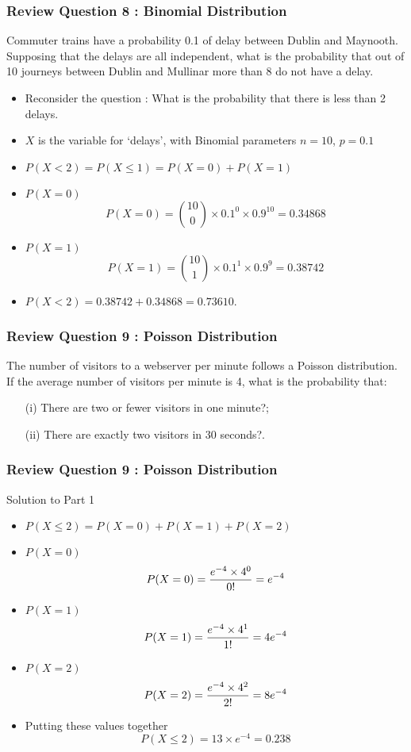 \documentclass[a4]{beamer}
\begin{document}
\begin{frame}
\frametitle{Review Question 8 :  Binomial Distribution}
Commuter trains have a probability 0.1 of delay
between Dublin and Maynooth. Supposing that the delays are all independent,
what is the probability that out of 10 journeys between Dublin and
Mullinar more than 8 do not have a delay.
\begin{itemize}
\item Reconsider the question : What is the probability that there is less than 2 delays.
\item $X$ is the variable for `delays', with Binomial parameters $n=10$, $p=0.1$
\item $P(X < 2) = P(X \leq 1) = P(X=0)+P(X=1)$
\item $P(X=0)$
\[P(X=0)= {10 \choose 0} \times 0.1^0  \times 0.9^10 = 0.34868\]
\item $P(X=1)$
\[P(X=1)= {10 \choose 1} \times 0.1^1  \times 0.9^9 = 0.38742\]
\item $P(X < 2) = 0.38742 + 0.34868 = 0.73610.$
\end{itemize}
\end{frame}
\begin{frame}
\frametitle{Review Question 9 :  Poisson Distribution}
The number of visitors to a webserver per minute follows a Poisson
distribution. If the average number of visitors per minute is 4,
what is the probability that:
\begin{itemize}
\item[(i)] There are two or fewer visitors in one minute?;
\item[(ii)] There are exactly two visitors in 30 seconds?.
\end{itemize}


\end{frame}
\begin{frame}
\frametitle{Review Question 9 :  Poisson Distribution}
Solution to Part 1
\begin{itemize}
\item $P(X\leq 2) = P(X = 0) + P(X = 1) + P(X = 2)$
\item $P(X = 0)$
 \[P(X = 0) = { e^{-4} \times 4^0\over 0!} = e^{-4}\]
\item $P(X = 1)$
\[P(X = 1) = { e^{-4} \times 4^1\over 1!} = 4e^{-4}\]
\item $P(X = 2)$
\[P(X = 2) = { e^{-4} \times 4^2\over 2!} = 8e^{-4}\]
\item Putting these values together
\[P(X\leq 2) = 13 \times e^{-4} = 0.238\]
\end{itemize}
\end{frame}
\end{document}
